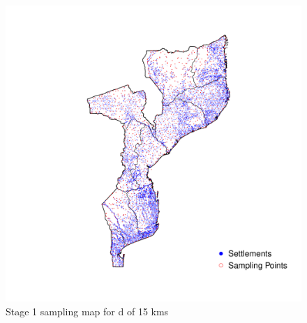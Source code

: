 \documentclass[
  12pt,
  a4paper]{article}
\begin{document}
\begin{figure}[H]

{\centering \includegraphics{mozambiqueNotes_files/figure-latex/stage1plot15-1} 

}

\caption{Stage 1 sampling map for d of 15 kms}\label{fig:stage1plot15}
\end{figure}

  
\end{document}
